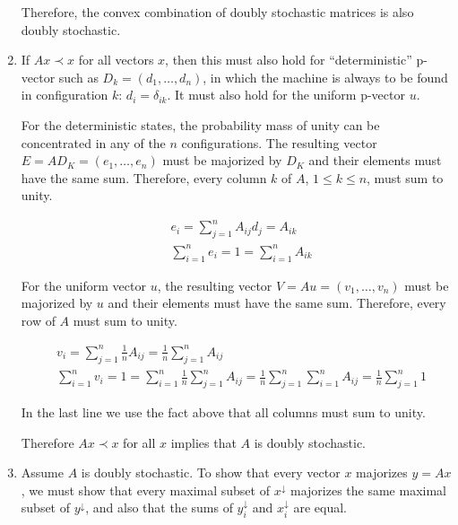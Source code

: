 \documentclass[12pt]{article}
\begin{document}
\begin{enumerate}
Therefore, the convex combination of doubly stochastic matrices is also
doubly stochastic.

\item

If $Ax \prec x$ for all vectors $x$, then this must also hold for
``deterministic'' p-vector such as $D_k = (d_1 ,\ldots, d_n)$, in which the
machine is always to be found in configuration $k$: $d_i = \delta_{ik}$.
It must also hold for the uniform p-vector $u$.



For the deterministic states, the probability mass of unity can be
concentrated in any of the $n$ configurations.
The resulting vector $E = AD_K = (e_1,\ldots, e_n)$ must
be majorized by $D_K$ and their elements must have the same sum.
Therefore, every column $k$ of
$A$, $1 \le k \le n$, must sum to unity.

\begin{eqnarray*}
&\displaystyle e_i = \sum_{j=1}^n A_{ij} d_j = A_{ik}\\
&\displaystyle \sum_{i=1}^n e_i = 1 = \sum_{i=1}^n A_{ik}
\end{eqnarray*}

For the uniform vector $u$, the resulting vector
$V = Au = (v_1,\ldots, v_n)$ must be majorized
by $u$ and their elements must have the same sum.
Therefore, every row of $A$ must sum to unity.

\begin{eqnarray*}
& \displaystyle v_i = \sum_{j=1}^n  \frac{1}{n}A_{ij} = \frac{1}{n} \sum_{j=1}^n A_{ij}\\
& \displaystyle \sum_{i=1}^n v_i = 1 = \sum_{i=1}^n \frac{1}{n} \sum_{j=1}^n A_{ij} = \frac{1}{n} \sum_{j=1}^n \sum_{i=1}^n A_{ij} = \frac{1}{n} \sum_{j=1}^n 1
\end{eqnarray*}

In the last line we use the
fact above that all columns must sum to unity.

Therefore $Ax \prec x$ for all $x$ implies that $A$ is doubly stochastic.

\item
Assume $A$ is doubly stochastic. To show that every vector $x$ majorizes
$y = Ax$, we must show that every maximal subset of $x^\downarrow$
majorizes the same maximal subset of $y^\downarrow$, and also
that the sums of $y_i^\downarrow$ and $x_i^\downarrow$ are equal.


\end{enumerate}
\end{document}
